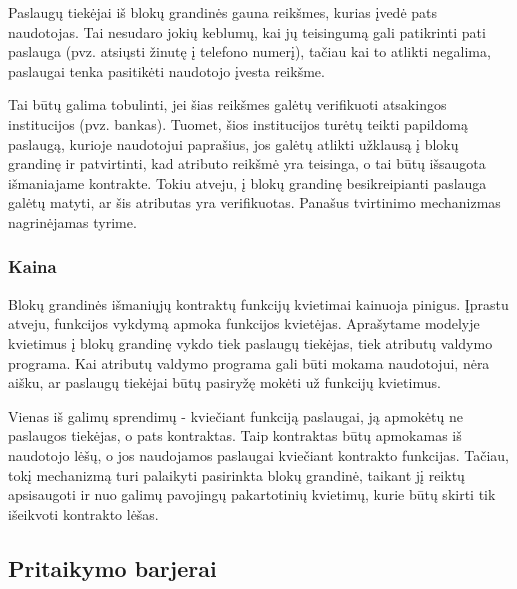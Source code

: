 Paslaugų tiekėjai iš blokų grandinės gauna reikšmes, kurias įvedė pats naudotojas. Tai nesudaro jokių keblumų,
kai jų teisingumą gali patikrinti pati paslauga (pvz. atsiųsti žinutę į telefono numerį), tačiau kai to atlikti negalima,
paslaugai tenka pasitikėti naudotojo įvesta reikšme.

Tai būtų galima tobulinti, jei šias reikšmes galėtų verifikuoti
atsakingos institucijos (pvz. bankas). Tuomet, šios institucijos turėtų teikti papildomą paslaugą, kurioje naudotojui
paprašius, jos galėtų atlikti užklausą į blokų grandinę ir patvirtinti, kad atributo reikšmė yra teisinga, o tai būtų
išsaugota išmaniajame kontrakte. Tokiu atveju,
į blokų grandinę besikreipianti paslauga galėtų matyti, ar šis atributas yra verifikuotas. Panašus tvirtinimo mechanizmas
nagrinėjamas \cite{Baars2016} tyrime.

\subsubsection{Kaina}

Blokų grandinės išmaniųjų kontraktų funkcijų kvietimai kainuoja pinigus. Įprastu atveju, funkcijos vykdymą apmoka
funkcijos kvietėjas.
Aprašytame modelyje kvietimus į blokų grandinę vykdo tiek paslaugų tiekėjas, tiek atributų valdymo programa. Kai atributų valdymo
programa gali būti mokama naudotojui, nėra aišku, ar paslaugų tiekėjai būtų pasiryžę mokėti už funkcijų kvietimus.

Vienas iš galimų sprendimų - kviečiant funkciją paslaugai, ją apmokėtų ne paslaugos tiekėjas, o pats kontraktas. Taip
kontraktas būtų apmokamas iš naudotojo lėšų, o jos naudojamos paslaugai kviečiant kontrakto funkcijas.
Tačiau, tokį mechanizmą turi palaikyti pasirinkta blokų grandinė, taikant jį reiktų apsisaugoti ir nuo
galimų pavojingų pakartotinių kvietimų, kurie būtų skirti tik išeikvoti kontrakto lėšas.

\subsection{Pritaikymo barjerai}